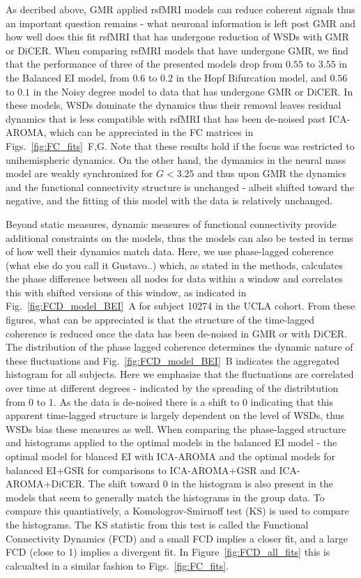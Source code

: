 \documentclass[oneside]{zHenriquesLab-StyleBioRxiv}
\begin{document}
As decribed above, GMR applied rsfMRI models can reduce coherent signals thus an important question remains - what neuronal information is left post GMR and how well does this fit rsfMRI that has undergone reduction of WSDs with GMR or DiCER. When comparing rsfMRI models that have undergone GMR, we find that the performance of three of the presented models drop from $0.55$ to $3.55$ in the Balanced EI model, from $0.6$ to $0.2$ in the Hopf Bifurcation model, and $0.56$ to $0.1$ in the Noisy degree model to data that has undergone GMR or DiCER. In these models, WSDs dominate the dynamics thus their removal leaves residual dynamics that is less compatible with rsfMRI that has been de-noised past ICA-AROMA, which can be appreciated in the FC matrices in Figs.~\ref{fig:FC_fits}~F,G. Note that these results hold if the focus was restricted to unihemispheric dynamics. On the other hand, the dymamics in the neural mass model are weakly synchronized for $G<3.25$ and thus upon GMR the dynamics and the functional connectivity structure is unchanged - albeit shifted toward the negative, and the fitting of this model with the data is relatively unchanged. 

Beyond static measures, dynamic measures of functional connectivity provide additional constraints on the models, thus the models can also be tested in terms of how well their dynamics match data. Here, we use phase-lagged coherence (what else do you call it Gustavo..) which, as stated in the methods, calculates the phase difference between all nodes for data within a window and correlates this with shifted versions of this window, as indicated in Fig.~\ref{fig:FCD_model_BEI}~A for subject 10274 in the UCLA cohort. From these figures, what can be appreciated is that the structure of the time-lagged coherence is reduced once the data has been de-noised in GMR or with DiCER. The distribution of the phase lagged coherence determines the dynamic nature of these fluctuations and Fig.~\ref{fig:FCD_model_BEI}~B indicates the aggregated histogram for all subjects. Here we emphasize that the fluctuations are correlated over time at different degrees - indicated by the spreading of the distribtution from 0 to 1. As the data is de-noised there is a shift to 0 indicating that this apparent time-lagged structure is largely dependent on the level of WSDs, thus WSDs bias these measures as well. When comparing the phase-lagged structure and histograms applied to the optimal models in the balanced EI model - the optimal model for blanced EI with ICA-AROMA and the optimal models for balanced EI+GSR for comparisons to ICA-AROMA+GSR and ICA-AROMA+DiCER. The shift toward 0 in the histogram is also present in the models that seem to generally match the histograms in the group data. To compare this quantiatively, a Komologrov-Smirnoff test (KS) is used to compare the histograms. The KS statistic from this test is called the Functional Connectivity Dynamics (FCD) and a small FCD implies a closer fit, and a large FCD (close to 1) implies a divergent fit. In Figure~\ref{fig:FCD_all_fits} this is calcualted in a similar fashion to Figs.~\ref{fig:FC_fits}. 
\end{document}
